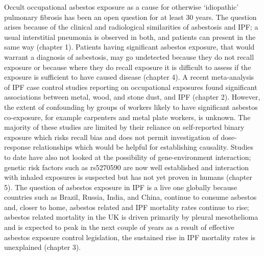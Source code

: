 \documentclass[
]{article}
\begin{document}
Occult occupational asbestos exposure as a cause for otherwise
`idiopathic' pulmonary fibrosis has been an open question for at least
30 years. The question arises because of the clinical and radiological
similarities of asbestosis and IPF; a usual interstitial pneumonia is
observed in both, and patients can present in the same way (chapter 1).
Patients having significant asbestos exposure, that would warrant a
diagnosis of asbestosis, may go undetected because they do not recall
exposure or because where they do recall exposure it is difficult to
assess if the exposure is sufficient to have caused disease (chapter 4).
A recent meta-analysis of IPF case control studies reporting on
occupational exposures found significant associations between metal,
wood, and stone dust, and IPF (chapter 2). However, the extent of
confounding by groups of workers likely to have significant asbestos
co-exposure, for example carpenters and metal plate workers, is unknown.
The majority of these studies are limited by their reliance on
self-reported binary exposure which risks recall bias and does not
permit investigation of dose-response relationships which would be
helpful for establishing causality. Studies to date have also not looked
at the possibility of gene-environment interaction; genetic risk factors
such as rs5270590 are now well established and interaction with inhaled
exposures is suspected but has not yet proven in humans (chapter 5). The
question of asbestos exposure in IPF is a live one globally because
countries such as Brazil, Russia, India, and China, continue to consume
asbestos and, closer to home, asbestos related and IPF mortality rates
continue to rise; asbestos related mortality in the UK is driven
primarily by pleural mesothelioma and is expected to peak in the next
couple of years as a result of effective asbestos exposure control
legislation, the sustained rise in IPF mortality rates is unexplained
(chapter 3).
\end{document}
